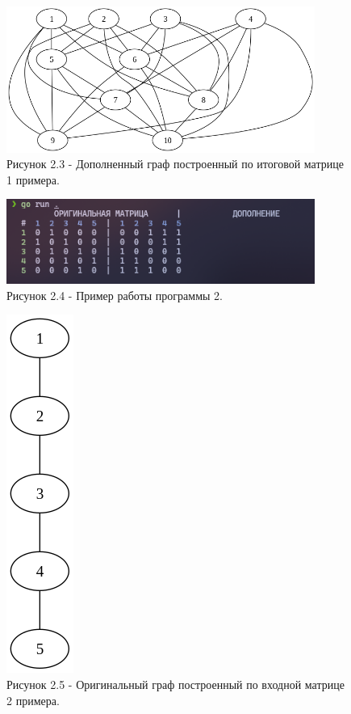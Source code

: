 \documentclass[oneside,a4paper,14pt]{extarticle}
\begin{document}
\begin{figure}[H]
	\centering
	\includegraphics[width=0.9\textwidth]{pics/complement_graph1.png}
	\caption*{Рисунок 2.3 - Дополненный граф построенный по итоговой матрице 1 примера.}
\end{figure}

\clearpage
\begin{figure}[H]
	\centering
	\includegraphics[width=0.9\textwidth]{pics/screen2.png}
	\caption*{Рисунок 2.4 - Пример работы программы 2.}
\end{figure}

\begin{figure}[H]
	\centering
	\includegraphics[height=0.25\textheight]{pics/original_graph2.png}
	\caption*{Рисунок 2.5 - Оригинальный граф построенный по входной матрице 2 примера.}
\end{figure}
\end{document}
